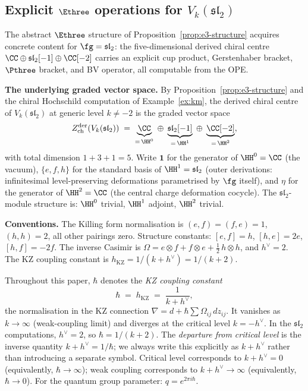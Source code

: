 \subsection{Explicit $\Ethree$ operations for
$V_k(\mathfrak{sl}_2)$}
\label{subsec:e3-explicit}

The abstract $\Ethree$ structure of
Proposition~\ref{prop:e3-structure} acquires concrete content
for $\fg = \mathfrak{sl}_2$: the five-dimensional derived
chiral centre $\CC \oplus \mathfrak{sl}_2[-1] \oplus \CC[-2]$
carries an explicit cup product, Gerstenhaber bracket,
$\Pthree$ bracket, and BV operator, all computable from the
OPE.

\medskip
\noindent
\textbf{The underlying graded vector space.}
By Proposition~\ref{prop:e3-structure} and the chiral
Hochschild computation of
Example~\ref{ex:km}, the derived chiral centre of
$V_k(\mathfrak{sl}_2)$ at generic level
$k \neq -2$ is the graded vector space
\begin{equation}\label{eq:e3-graded-space}
  Z^{\mathrm{der}}_{\mathrm{ch}}(V_k(\mathfrak{sl}_2))
  \;=\;
  \underbrace{\CC}_{=\, \HH^0}
  \;\oplus\;
  \underbrace{\mathfrak{sl}_2[-1]}_{=\, \HH^1}
  \;\oplus\;
  \underbrace{\CC[-2]}_{=\, \HH^2},
\end{equation}
with total dimension $1 + 3 + 1 = 5$. Write $\mathbf{1}$
for the generator of $\HH^0 = \CC$ (the vacuum),
$\{e, f, h\}$ for the standard basis of
$\HH^1 = \mathfrak{sl}_2$
(outer derivations: infinitesimal level-preserving
deformations parametrised by $\fg$ itself), and $\eta$
for the generator of $\HH^2 = \CC$
(the central charge deformation cocycle). The
$\mathfrak{sl}_2$-module structure is: $\HH^0$ trivial,
$\HH^1$ adjoint, $\HH^2$ trivial.

\medskip
\noindent
\textbf{Conventions.}
The Killing form normalisation is
$(e, f) = (f, e) = 1$, $(h, h) = 2$, all other pairings zero.
Structure constants: $[e, f] = h$, $[h, e] = 2e$,
$[h, f] = -2f$. The inverse Casimir is
$\Omega = e \otimes f + f \otimes e
+ \tfrac{1}{2}\,h \otimes h$, and $h^\vee = 2$.
The KZ coupling constant is
$h_{\mathrm{KZ}} = 1/(k + h^\vee) = 1/(k + 2)$.

\begin{remark}
\label{rem:hbar-convention}
Throughout this paper, $\hbar$ denotes the
\emph{KZ coupling constant}
\begin{equation}\label{eq:hbar-convention}
  \hbar \;=\; h_{\mathrm{KZ}}
  \;=\; \frac{1}{k + h^\vee},
\end{equation}
the normalisation in the KZ connection
$\nabla = d + \hbar \sum \Omega_{ij}\,dz_{ij}$.
It vanishes as $k \to \infty$ (weak-coupling limit) and
diverges at the critical level $k = -h^\vee$.
In the $\mathfrak{sl}_2$ computations, $h^\vee = 2$,
so $\hbar = 1/(k+2)$.
The \emph{departure from critical level} is the inverse
quantity $k + h^\vee = 1/\hbar$; we always write this
explicitly as $k + h^\vee$ rather than introducing a
separate symbol. Critical level corresponds to
$k + h^\vee = 0$ (equivalently, $\hbar \to \infty$);
weak coupling corresponds to $k + h^\vee \to \infty$
(equivalently, $\hbar \to 0$).
For the quantum group parameter: $q = e^{2\pi i \hbar}$.
\end{remark}

